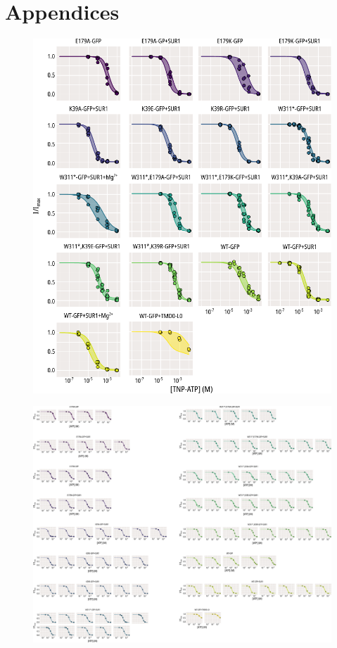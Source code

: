 \chapter{\label{ch:8-appendix}Appendices} 

\graphicspath{{figures/appendix/}}

\begin{figure}[h]
	\centering
	\includegraphics[width=\textwidth]{all_atp_fits.pdf}
	\caption[ATP inhibition population hill fits]{
	}
	\label{apxfig:atp_inhib_1}
\end{figure}

\begin{figure}[h]
	\centering
	\includegraphics[width=\textwidth]{all_atp_fits_2.pdf}
	\caption[ATP inhibition sample hill fits]{
	}
	\label{apxfig:atp_inhib_2}
\end{figure}

